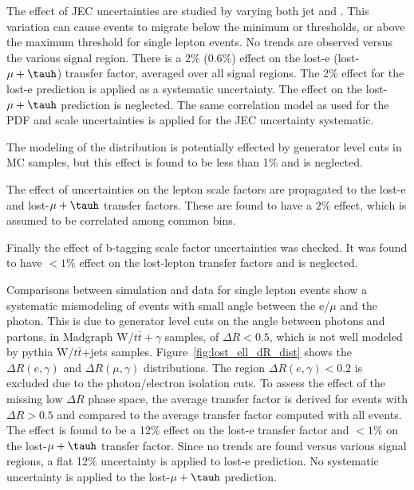 The effect of JEC uncertainties are studied by varying both jet \pt and \ptmiss.
This variation can cause events 
to migrate below the minimum \ptmiss or \ST thresholds, or above the maximum
\mt threshold for single lepton events.  No trends are observed versus 
the various signal region.  There is a 2\% (0.6\%) effect on the lost-e (lost-$\mu+\tauh$)
transfer factor, averaged over all signal regions.  The 2\% effect for the lost-e 
prediction is applied as a systematic uncertainty.  The effect on the lost-$\mu+\tauh$
prediction is neglected.
The same correlation model as used for the PDF and scale uncertainties is applied
for the JEC uncertainty systematic.  

The modeling of the \mt distribution is potentially effected by generator
level cuts in MC samples, but this effect is found to be
less than 1\% and is neglected.

The effect of uncertainties on the lepton scale factors are propagated
to the lost-e and lost-$\mu+\tauh$ transfer factors.  These are found to have
a 2\% effect, which is assumed to be correlated among common \ptmiss bins.  

Finally the effect of b-tagging scale factor uncertainties was checked.  
It was found to have $<1\%$ effect on the lost-lepton transfer factors
and is neglected. 

Comparisons between simulation and data for single lepton events show
a systematic mismodeling of events with small angle between the e/$\mu$
and the photon.  This is due to generator level cuts on the angle between
photons and partons, in Madgraph W/$t\bar{t}+\gamma$ samples, of $\Delta R<0.5$,
which is not well modeled by pythia W/$t\bar{t}$+jets samples. Figure~\ref{fig:lost_ell_dR_dist}
shows the $\Delta R(e,\gamma)$ and $\Delta R(\mu,\gamma)$ distributions.  
The region $\Delta R(e,\gamma)<0.2$ is excluded due to the photon/electron
isolation cuts. To assess the effect of the missing low $\Delta R$
phase space, the average transfer factor is derived for events with 
$\Delta R>0.5$ and compared to the average transfer factor computed 
with all events.  The effect is found to be a 12\%
effect on the lost-e transfer factor and $<1\%$ on the 
lost-$\mu+\tauh$ transfer factor.  Since no trends are found versus various 
signal regions, a flat 12\% uncertainty is applied
to lost-e prediction.  No systematic uncertainty is applied to
the lost-$\mu+\tauh$ prediction.

